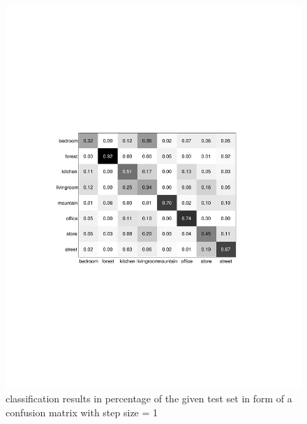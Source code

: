 \documentclass[subfigure,epsfig,fleqn,float,numbers=noenddot]{scrartcl}
\begin{document}
\begin{figure}
		\centering
		\includegraphics[width=\textwidth]{img/conf_matrix_step1.pdf}
		\caption{classification results in percentage of the given test set in form of a confusion matrix with step size = 1}
		\label{fig:stepsize}
\end{figure}
\end{document}
